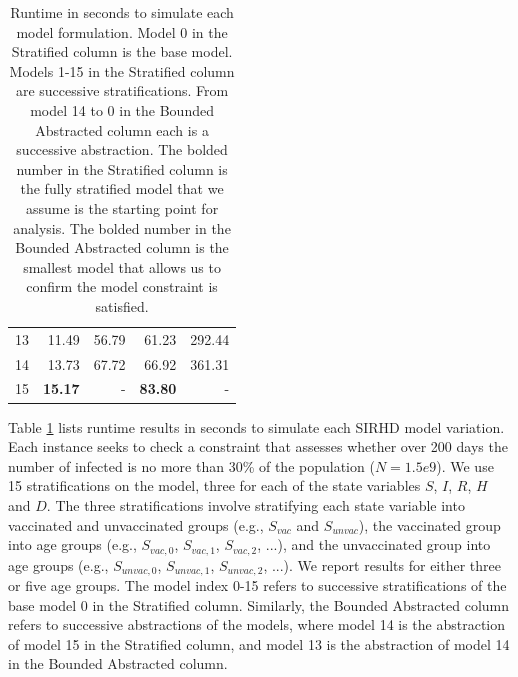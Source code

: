 \begin{table}
\begin{tabular}{|r||r|r||r|r|}
		13          & 11.49                               & 56.79                              & 61.23        & 292.44      \\
		14          & 13.73                               & 67.72                              & 66.92        & 361.31      \\
		15          & {\bf 15.17}                         & -                                  & {}\bf 83.80} & -           \\	\hline
	\end{tabular}
	\caption{\label{tab:sirhd_results}  Runtime in seconds to simulate each model formulation.  Model 0 in the Stratified column is the base model.  Models 1-15 in the Stratified column are successive stratifications.  From model 14 to 0 in the Bounded Abstracted column each is a successive abstraction.  The bolded number in the Stratified column is the fully stratified model that we assume is the starting point for analysis.  The bolded number in the Bounded Abstracted column is the smallest model that allows us to confirm the model constraint is satisfied.}

\end{table}

Table \ref{tab:sirhd_results} lists runtime results in seconds to simulate each SIRHD model variation.  Each instance seeks to check a constraint that assesses whether over 200 days the number of infected is no more than 30\% of the population ($N=1.5e9$).  We use 15 stratifications on the model, three for each of the state variables $S$, $I$, $R$, $H$ and $D$.  The three stratifications involve stratifying each state variable into vaccinated and unvaccinated groups (e.g., $S_{vac}$ and $S_{unvac}$), the vaccinated group into age groups (e.g., $S_{vac,0}$, $S_{vac,1}$, $S_{vac,2}$, ...), and the unvaccinated group into age groups (e.g., $S_{unvac,0}$, $S_{unvac,1}$, $S_{unvac,2}$, ...).  We report results for either three or five age groups.  The model index 0-15 refers to successive stratifications of the base model 0 in the Stratified column.  Similarly, the Bounded Abstracted column refers to successive abstractions of the models, where model 14 is the abstraction of model 15 in the Stratified column, and model 13 is the abstraction of model 14 in the Bounded Abstracted column.

